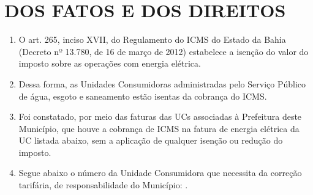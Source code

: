 \newcommand{\tipoRequerimento}{Isenção de ICMS}

\section{DOS FATOS E DOS DIREITOS}

\begin{enumerate}[resume]
    \item O art. 265, inciso XVII, do Regulamento do ICMS do Estado da Bahia (Decreto nº 13.780, de 16 de março de 2012) estabelece a isenção do valor do imposto sobre as operações com energia elétrica.


    \item Dessa forma, as Unidades Consumidoras administradas pelo Serviço Público de água, esgoto e saneamento estão isentas da cobrança do ICMS.

    \item Foi constatado, por meio das faturas das UCs associadas à Prefeitura deste Município, que houve a cobrança de ICMS na fatura de energia elétrica da UC listada abaixo, sem a aplicação de qualquer isenção ou redução do imposto.

    \item Segue abaixo o número da Unidade Consumidora que necessita da correção tarifária, de responsabilidade do Município: \textbf{\unidadeConsumidora{}}.


\end{enumerate}

